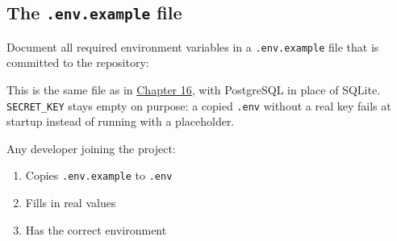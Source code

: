 \subsection*{\texorpdfstring{The \texttt{.env.example} file}{The .env.example file}}\label{39-local-vs-production:the-envexample-file}

Document all required environment variables in a \texttt{.env.example} file that is committed to the repository:

\begin{codebox}

\begin{Shaded}
\begin{Highlighting}[]

\OperatorTok{=}

\OperatorTok{=}

\OperatorTok{=}
\OperatorTok{=}
\OperatorTok{=}

\OperatorTok{=}
\OperatorTok{=}
\OperatorTok{=}
\end{Highlighting}
\end{Shaded}

\end{codebox}

\noindent{}This is the same file as in \hyperref[ch:16-logging-error-handling]{Chapter 16}, with PostgreSQL in place of SQLite. \texttt{SECRET\_KEY} stays empty on purpose: a copied \texttt{.env} without a real key fails at startup instead of running with a placeholder.

Any developer joining the project:

\begin{enumerate}
\def\labelenumi{\arabic{enumi}.}
\tightlist
\item
  Copies \texttt{.env.example} to \texttt{.env}
\item
  Fills in real values
\item
  Has the correct environment
\end{enumerate}


